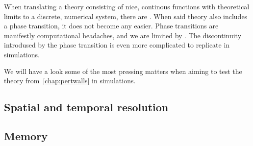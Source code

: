 


When translating a theory consisting of nice, continous functions with theoretical limits to a discrete, numerical system, there are \blahblah. When said theory also includes a phase transition, it does not become any easier. Phase transitions are manifestly computational headaches, and we are limited by \blahblah. The discontinuity introdused by the phase transition is even more complicated to replicate in simulations. 


\phpar[BCs]


We will have a look some of the most pressing matters when aiming to test the theory from~\cref{chap:pertwalls} in simulations. 



\subsection{Spatial and temporal resolution}



\subsection{Memory}




